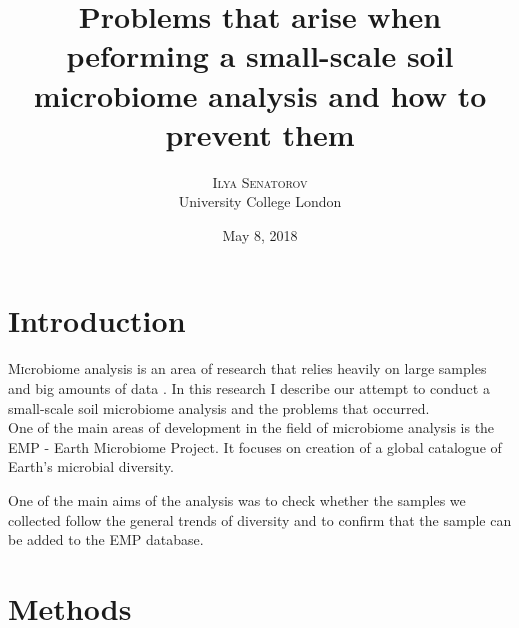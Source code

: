 \documentclass[twoside,twocolumn]{article}
\title{Problems that arise when peforming a small-scale soil microbiome analysis and how to prevent them}
\author{
\textsc{Ilya Senatorov} \\
\normalsize University College London \\
}
\date{May 8, 2018}
\begin{document}
\maketitle



\section{Introduction}

\lettrine[nindent=0em,lines=3]{M}icrobiome analysis is an area of research that relies heavily on large samples and big amounts of data \cite{Thompson2017}. In this research I describe our attempt to conduct a small-scale soil microbiome analysis and the problems that occurred.\\
One of the main areas of development in the field of microbiome analysis is the EMP - Earth Microbiome Project\cite{Gilbert2014}. It focuses on creation of a global catalogue of Earth's microbial diversity.


One of the main aims of the analysis was to check whether the samples we collected follow the general trends of diversity and to confirm that the sample can be added to the EMP database.


\section{Methods}
\end{document}
